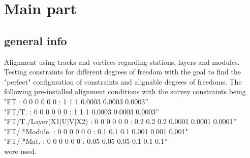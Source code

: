 \chapter{Main part}
\label{sec:story}


\section{general info}

Alignment using tracks and vertices regarding stations, layers and modules. Testing constraints for different degrees of freedom with the goal to find the "perfect" configuration of constraints and alignable degrees of freedoms.
The following pre-installed alignment conditions with the survey constraints being\\
"FT : 0 0 0 0 0 0 : 1 1 1 0.0003 0.0003 0.0003”\\
"FT/T. : 0 0 0 0 0 0 : 1 1 1 0.0003 0.0003 0.0003”\\
"FT/T./Layer(X1|U|V|X2) : 0 0 0 0 0 0 : 0.2 0.2 0.2 0.0001 0.0001 0.0001”\\
"FT/.*Module. : 0 0 0 0 0 0 : 0.1 0.1 0.1 0.001 0.001 0.001"\\
"FT/.*Mat. : 0 0 0 0 0 0 : 0.05 0.05 0.05 0.1 0.1 0.1”\\
were used.

